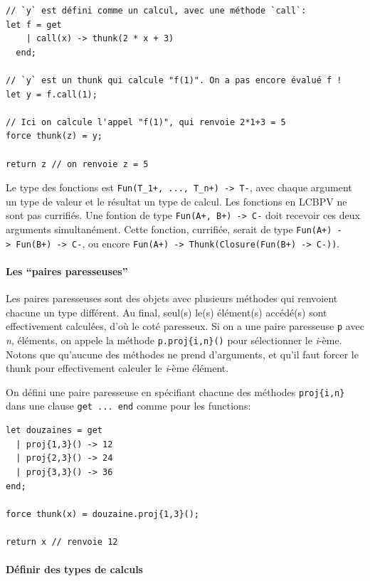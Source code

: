 \documentclass[12pt]{article}
\begin{document}
\begin{verbatim}
// `y` est défini comme un calcul, avec une méthode `call`:
let f = get 
    | call(x) -> thunk(2 * x + 3)
  end;
  
// `y` est un thunk qui calcule "f(1)". On a pas encore évalué f !
let y = f.call(1);

// Ici on calcule l'appel "f(1)", qui renvoie 2*1+3 = 5
force thunk(z) = y;

return z // on renvoie z = 5
\end{verbatim}

Le type des fonctions est
\texttt{Fun(T\_1+,\ ...,\ T\_n+)\ -\textgreater{}\ T-}, avec chaque
argument un type de valeur et le résultat un type de calcul. Les
fonctions en LCBPV ne sont pas currifiés. Une fontion de type
\texttt{Fun(A+,\ B+)\ -\textgreater{}\ C-} doit recevoir ces deux
arguments simultanément. Cette fonction, currifiée, serait de type
\texttt{Fun(A+)\ -\textgreater{}\ Fun(B+)\ -\textgreater{}\ C-}, ou
encore
\texttt{Fun(A+)\ -\textgreater{}\ Thunk(Closure(Fun(B+)\ -\textgreater{}\ C-))}.

\hypertarget{les-paires-paresseuses}{%
      \paragraph*{Les ``paires
            paresseuses''}\label{les-paires-paresseuses}}

Les paires paresseuses sont des objets avec plusieurs méthodes qui
renvoient chacune un type différent. Au final, seul(s) le(s) élément(s)
accédé(s) sont effectivement calculées, d'où le coté paresseux. Si on a
une paire paresseuse \texttt{p} avec \emph{n}, éléments, on appele la
méthode \texttt{p.proj\{i,n\}()} pour sélectionner le \emph{i}-ème.
Notons que qu'aucune des méthodes ne prend d'arguments, et qu'il faut
forcer le thunk pour effectivement calculer le \emph{i}-ème élément.

On défini une paire paresseuse en spécifiant chacune des méthodes
\texttt{proj\{i,n\}} dans une clause \texttt{get\ ...\ end} comme pour
les functions:

\begin{verbatim}
let douzaines = get
  | proj{1,3}() -> 12
  | proj{2,3}() -> 24
  | proj{3,3}() -> 36
end;

force thunk(x) = douzaine.proj{1,3}();

return x // renvoie 12
\end{verbatim}

\hypertarget{duxe9finir-des-types-de-calculs}{%
      \paragraph*{Définir des types de
            calculs}\label{duxe9finir-des-types-de-calculs}}
\end{document}
